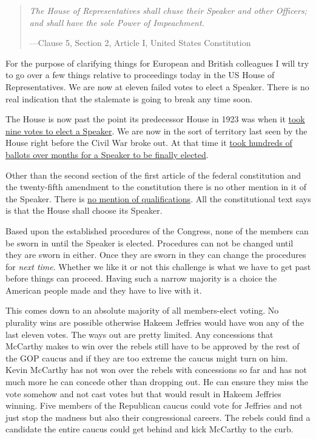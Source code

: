 \begin{quote}
\emph{The House of Representatives shall chuse their Speaker and other
Officers; and shall have the sole Power of Impeachment.}

---Clause 5, Section 2, Article I, United States Constitution
\end{quote}

For the purpose of clarifying things for European and British colleagues
I will try to go over a few things relative to proceedings today in the
US House of Representatives. We are now at eleven failed votes to elect
a Speaker. There is no real indication that the stalemate is going to
break any time soon.

The House is now past the point its predecessor House in 1923 was when
it
\href{https://history.house.gov/People/Office/Speakers-Multiple-Ballots/}{took
nine votes to elect a Speaker}. We are now in the sort of territory last
seen by the House right before the Civil War broke out. At that time it
\href{https://history.house.gov/People/Office/Speakers-Multiple-Ballots/}{took
hundreds of ballots over months for a Speaker to be finally elected}.

Other than the second section of the first article of the federal
constitution and the twenty-fifth amendment to the constitution there is
no other mention in it of the Speaker. There is
\href{https://web.archive.org/web/20210305112024/https://fas.org/sgp/crs/misc/97-780.pdf}{no
mention of qualifications}. All the constitutional text says is that the
House shall choose its Speaker.

Based upon the established procedures of the Congress, none of the
members can be sworn in until the Speaker is elected. Procedures can not
be changed until they are sworn in either. Once they are sworn in they
can change the procedures for \emph{next time}. Whether we like it or
not this challenge is what we have to get past before things can
proceed. Having such a narrow majority is a choice the American people
made and they have to live with it.

This comes down to an absolute majority of all members-elect voting. No
plurality wins are possible otherwise Hakeem Jeffries would have won any
of the last eleven votes. The ways out are pretty limited. Any
concessions that McCarthy makes to win over the rebels still have to be
approved by the rest of the GOP caucus and if they are too extreme the
caucus might turn on him. Kevin McCarthy has not won over the rebels
with concessions so far and has not much more he can concede other than
dropping out. He can ensure they miss the vote somehow and not cast
votes but that would result in Hakeem Jeffries winning. Five members of
the Republican caucus could vote for Jeffries and not just stop the
madness but also their congressional careers. The rebels could find a
candidate the entire caucus could get behind and kick McCarthy to the
curb.

